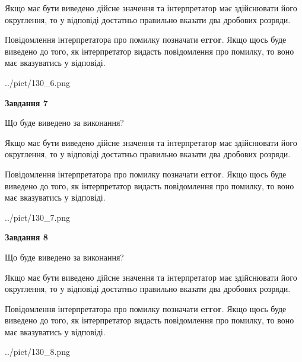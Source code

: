 \documentclass[12pt, ukrainian]{article}
\begin{document}
{\begin {Large}
Якщо має бути виведено дійсне значення та інтерпретатор має здійснювати його округлення, 
то у відповіді достатньо правильно вказати два дробових розряди.

Повідомлення інтерпретатора про помилку позначати \textbf{error}.
Якщо щось буде виведено до того, як інтерпретатор видасть повідомлення про помилку, 
то воно має вказуватись у відповіді. \par

\begin{center}
	{../pict/130_6.png}
\end{center}
\newpage

{\begin {center}\textbf{Завдання 7}\end {center}}\par
Що буде виведено за виконання? \par

Якщо має бути виведено дійсне значення та інтерпретатор має здійснювати його округлення, 
то у відповіді достатньо правильно вказати два дробових розряди.

Повідомлення інтерпретатора про помилку позначати \textbf{error}.
Якщо щось буде виведено до того, як інтерпретатор видасть повідомлення про помилку, 
то воно має вказуватись у відповіді. \par

\begin{center}
	{../pict/130_7.png}
\end{center}
\newpage

{\begin {center}\textbf{Завдання 8}\end {center}}\par
Що буде виведено за виконання? \par

Якщо має бути виведено дійсне значення та інтерпретатор має здійснювати його округлення, 
то у відповіді достатньо правильно вказати два дробових розряди.

Повідомлення інтерпретатора про помилку позначати \textbf{error}.
Якщо щось буде виведено до того, як інтерпретатор видасть повідомлення про помилку, 
то воно має вказуватись у відповіді. \par

\begin{center}
	{../pict/130_8.png}
\end{center}
\newpage


\end{Large}}
\end{document}
